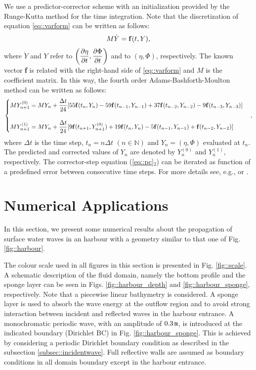 We use
a predictor-corrector   scheme with an initialization
provided by the Runge-Kutta method for the
time integration.
Note that the discretization of equation \eqref{eq::varform} can be written as follows:
\begin{equation}
M\dot Y={\bf f}(t,Y),
\end{equation}
where \(\dot Y\) and \(Y\) refer
to \(\displaystyle \left(\frac{\partial \eta}{\partial t},\frac{\partial \Phi}{\partial t}\right)\)
and  to \((\eta,\Phi)\), respectively. The  known vector {\bf f} is  related
with the right-hand side of \eqref{eq::varform} and \(M\) is the
coefficient matrix.
In this way,  the fourth order  Adams-Bashforth-Moulton method 
can be written as follows:  
\begin{equation}\label{eq::pc}
\begin{cases}
\displaystyle MY^{(0)}_{n+1}=MY_n+\frac{\Delta t}{24}[55{\bf f}(t_n,Y_n)-59{\bf
f}(t_{n-1},Y_{n-1})+37{\bf f}(t_{n-2},Y_{n-2})-9{\bf f}(t_{n-3},Y_{n-3})]\\ \\
\displaystyle MY^{(1)}_{n+1}=MY_n+\frac{\Delta t}{24}[9{\bf f}(t_{n+1},Y^{(0)}_{n+1})+19{\bf f}(t_n,Y_n)-5{\bf f}(t_{n-1},Y_{n-1})+{\bf f}(t_{n-2},Y_{n-2})]
\end{cases},
\end{equation}
where \(\Delta t\) is the time step, \(t_n=n\Delta
  t\) \((n\in \mathbb{N})\) and \(Y_n=(\eta,\Phi)\)
  evaluated at \(t_n\).
  The predicted and
corrected values of \(Y_n\) are denoted by \(Y_n^{(0)}\) and \(Y_n^{(1)}\),  respectively.  
The corrector-step equation (\eqref{eq::pc}\(_{2}\)) can
be iterated as  function of a predefined error
between consecutive time steps. For more details see, e.g.,  \cite{HaiWan91}
or \cite{Lam91}.



\section{Numerical Applications}
In this section, 
we present some numerical results about the propagation
 of surface water waves in an harbour with a geometry
similar to that one of  Fig. \ref{fig::harbour}.

The colour scale used in all
figures in this section is presented in
Fig. \ref{fig::scale}.
A schematic description of the fluid domain, namely the bottom profile and the
sponge layer can be seen in Figs. \ref{fig::harbour_depth}
and \ref{fig::harbour_sponge}, respectively.
Note that a piecewise linear bathymetry  is considered. 
A sponge layer is used to absorb the wave energy at the
outflow region 
and to avoid strong  interaction between incident and
reflected waves  in the harbour entrance.
 A monochromatic periodic wave, with  an
 amplitude of \(0.3\, {\tt m}\),
is introduced at the indicated boundary (Dirichlet BC) in
Fig. \ref{fig::harbour_sponge}.
This is achieved by considering
a periodic Dirichlet boundary condition as
described in the subsection \ref{subsec::incidentwave}.
Full reflective walls are assumed as boundary conditions in
all domain boundary except in the harbour entrance.

